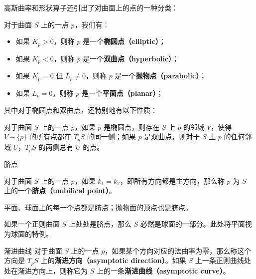 高斯曲率和形状算子还引出了对曲面上的点的一种分类：

\begin{definition}{}
对于曲面 $S$ 上的一点 $p$，我们有：
\begin{itemize}
\item 如果 $K_p>0$，则称 $p$ 是一个\textbf{椭圆点（elliptic）}；
\item 如果 $K_p<0$，则称 $p$ 是一个\textbf{双曲点（hyperbolic）}；
\item 如果 $K_p=0$ 但 $L_p\not=0$，则称 $p$ 是一个\textbf{抛物点（parabolic）}；
\item 如果 $L_p=0$，则称 $p$ 是一个\textbf{平面点（planar）}；
\end{itemize}
\end{definition}

其中对于椭圆点和双曲点，还特别地有以下性质：
\begin{theorem}{}
对于曲面 $S$ 上的一点 $p$，如果 $p$ 是椭圆点，则存在 $S$ 上 $p$ 的邻域 $V$，使得 $V-\{p\}$ 的所有点都在 $T_pS$ 的同一侧；如果 $p$ 是双曲点，则对于 $S$ 上 $p$ 的任何邻域 $U$，$T_pS$ 的两侧总有 $U$ 的点。
\end{theorem}


\begin{definition}{脐点}

对于曲面 $S$ 上的一点 $p$，如果 $k_1=k_2$，即所有方向都是主方向，那么称 $p$ 为 $S$ 上的一个\textbf{脐点（umbilical point）}。

\end{definition}

平面、球面上的每一个点都是脐点；抛物面的顶点也是脐点。

\begin{theorem}{}
如果一个正则曲面 $S$ 上处处是脐点，那么 $S$ 必然是球面的一部分。此处将平面视为球面的特例。
\end{theorem}

\begin{definition}{渐进曲线}
对于曲面 $S$ 上的一点 $p$，如果某个方向对应的法曲率为零，那么称这个方向是 $T_pS$ 上的\textbf{渐进方向（asymptotic direction）}。如果 $S$ 上一条正则曲线处处在渐进方向上，则称它为 $S$ 上的一条\textbf{渐进曲线（asymptotic curve）}。


\end{definition}


